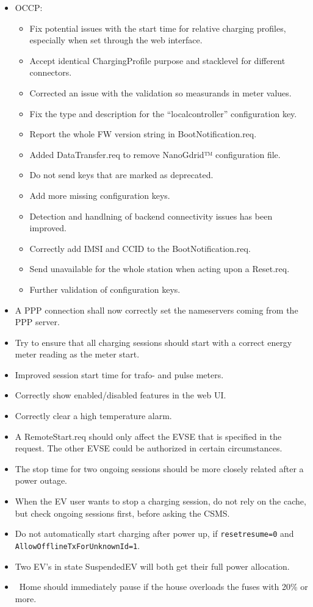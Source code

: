 \documentclass{scrartcl}
\begin{document}
\begin{itemize}
\item OCCP:
  \begin{itemize}
  \item  Fix potential issues with the start time for relative charging
    profiles, especially when set through the web interface.
  \item Accept identical ChargingProfile purpose and stacklevel for different
    connectors.
  \item Corrected an issue with the validation so measurands in meter values.
  \item Fix the type and description for the ``localcontroller'' configuration
    key.
  \item Report the whole FW version string in BootNotification.req.
  \item Added DataTransfer.req to remove NanoGdrid™ configuration file.
  \item Do not send keys that are marked as deprecated.
  \item Add more missing configuration keys.
  \item Detection and handlning of backend connectivity issues has been
    improved.
  \item Correctly add IMSI and CCID to the BootNotification.req.
  \item Send unavailable for the whole station when acting upon a Reset.req.
  \item Further validation of configuration keys.
  \end{itemize}
\item A PPP connection shall now correctly set the nameservers coming from the
  PPP server.
\item Try to ensure that all charging sessions should start with a correct
  energy meter reading as the meter start.
\item Improved session start time for trafo- and pulse meters.
\item Correctly show enabled/disabled features in the web UI.
\item Correctly clear a high temperature alarm.
\item A RemoteStart.req should only affect the EVSE that is specified in the
  request. The other EVSE could be authorized in certain circumstances.
\item The stop time for two ongoing sessions should be more closely related
  after a power outage.
\item When the EV user wants to stop a charging session, do not rely on the
  cache, but check ongoing sessions first, before asking the CSMS.
\item Do not automatically start charging after power up, if
  \verb|resetresume=0| and \verb|AllowOfflineTxForUnknownId=1|.
\item Two EV's in state SuspendedEV will both get their full power
  allocation.
\item \nanogrid\ Home should immediately pause if the house overloads the fuses
  with 20\% or more.
\end{itemize}
\end{document}
